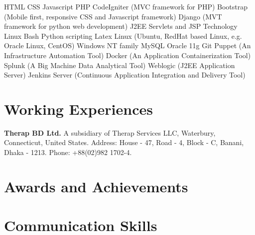 \documentclass[11pt,a4paper,sans]{moderncv}
\begin{document}
{
HTML
\newline CSS
\newline Javascript
\newline PHP
\newline CodeIgniter (MVC framework for PHP)
\newline Bootstrap (Mobile first, responsive CSS and Javascript framework)
\newline Django (MVT framework for python web development)
\newline J2EE Servlets and JSP Technology
}
{
Linux Bash
\newline Python scripting
\newline Latex
}
{
Linux (Ubuntu, RedHat based Linux, e.g. Oracle Linux, CentOS)
\newline Windows NT family
}
{
MySQL
\newline Oracle 11g
}
{
Git
}
{
Puppet (An Infrastructure Automation Tool)
\newline Docker (An Application Containerization Tool)
\newline Splunk (A Big Machine Data Analytical Tool)
\newline Weblogic (J2EE Application Server)
\newline Jenkins Server (Continuous Application Integration and Delivery Tool)
}


\section{Working Experiences}
{
\textbf{Therap BD Ltd.\newline}
A subsidiary of Therap Services LLC, Waterbury, Connecticut, United States.\newline
Address: House - 47, Road - 4, Block - C, Banani, Dhaka - 1213. \newline
Phone: +88(02)982 1702-4.
}

\section{Awards and Achievements}



\section{Communication Skills}
\end{document}
